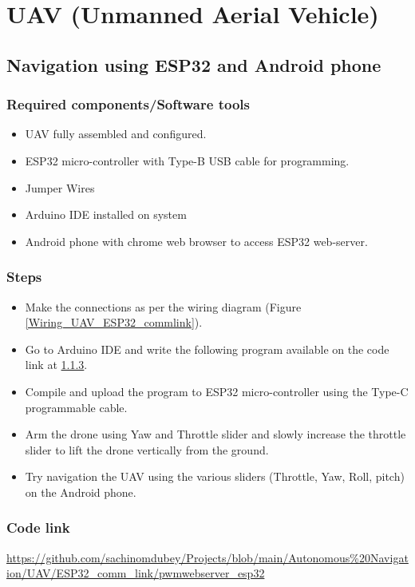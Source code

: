 \section{UAV (Unmanned Aerial Vehicle)}
\subsection{Navigation using ESP32 and Android phone} 
\subsubsection{Required components/Software tools}
\begin{itemize}
    \item UAV fully assembled and configured.
    \item ESP32 micro-controller with Type-B USB cable for programming.
    \item Jumper Wires
    \item Arduino IDE installed on system
    \item Android phone with chrome web browser to access ESP32 web-server.
\end{itemize}



\subsubsection{Steps}
\begin{itemize}
    \item Make the connections as per the wiring diagram (Figure \ref{Wiring_UAV_ESP32_commlink}).
    \item Go to Arduino IDE and write the following program available on the code link at \ref{Code_link_UAV_ESP32_commlink}.
    \item Compile and upload the program to ESP32 micro-controller using the Type-C programmable cable. 
    \item Arm the drone using Yaw and Throttle slider and slowly increase the throttle slider to lift the drone vertically from the ground.
    \item Try navigation the UAV using the various sliders (Throttle, Yaw, Roll, pitch) on the Android phone.
\end{itemize}

\subsubsection{Code link} \label{Code_link_UAV_ESP32_commlink}
\begin{tcolorbox}
\url{https://github.com/sachinomdubey/Projects/blob/main/Autonomous\%20Navigation/UAV/ESP32_comm_link/pwmwebserver_esp32}
\end{tcolorbox}

